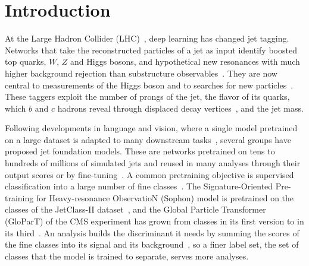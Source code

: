 \section{Introduction}\label{sec:intro}

At the Large Hadron Collider (LHC)~\cite{lhc}, deep learning has changed jet tagging. Networks that take the
reconstructed particles of a jet as input identify boosted top quarks, $W$, $Z$ and Higgs bosons, and
hypothetical new resonances with much higher background rejection than substructure
observables~\cite{larkoski,kogler,toptag,particlenet,part}. They are now central to measurements of the
Higgs boson and to searches for new particles~\cite{cmshcc,cmshhbbbb,cmsxyh,cmspart}. These taggers exploit
the number of prongs of the jet, the flavor of its quarks, which $b$ and $c$ hadrons reveal through
displaced decay vertices~\cite[Sec.~4.1]{cmsbtag}, and the jet mass.

Following developments in language and vision, where a single model pretrained on a large dataset is
adapted to many downstream tasks~\cite{bommasani,bert,mahajan,mae}, several groups have proposed jet
foundation models. These are networks pretrained on tens to hundreds of millions of simulated jets and
reused in many analyses through their output scores or by
fine-tuning~\cite{sophon,omnilearn,omnilearned,mpm,omnijet,hepjepa}. A common pretraining objective is
supervised classification into a large number of fine classes~\cite{sophon,glopartdp}. The
Signature-Oriented Pre-training for Heavy-resonance ObservatioN (Sophon) model is pretrained on the
\Kfull{} classes of the JetClass-II dataset~\cite{sophon,jetclasstwo}, and the Global Particle Transformer
(GloParT) of the CMS experiment has grown from \LitGlopartVoneNClasses{} classes in its first version to
\LitGlopartVthreeNClasses{} in its third~\cite{glopartdp}. An analysis builds the discriminant it needs by
summing the scores of the fine classes into its signal and its background~\cite{sophon,glopartdp}, so a
finer label set, the set of classes that the model is trained to separate, serves more analyses.

